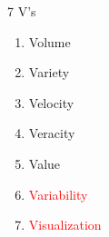 \documentclass[aspectratio=169]{beamer}
\begin{document}
\begin{frame}{7 V's}

\begin{enumerate}
\item Volume %
\item Variety  %
\item Velocity %
\item Veracity %
\item Value %
\item {\textcolor{red}{Variability}} %
\item {\textcolor{red}{Visualization}} 
\end{enumerate}
\end{frame}
\end{document}
